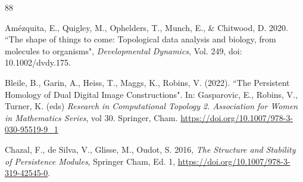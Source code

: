 \documentclass[a4paper,11pt]{article}
\theoremstyle{definition}
\begin{document}
\begin{thebibliography}{88} %


Amézquita, E., Quigley, M., Ophelders, T.,  Munch, E., \& Chitwood, D. 2020. ``The shape of things to come: Topological data analysis and biology, from molecules to organisms", \textit{Developmental Dynamics}, Vol. 249, doi: 10.1002/dvdy.175. 

 
 

 Bleile, B., Garin, A., Heiss, T., Maggs, K., Robins, V. (2022). ``The Persistent Homology of Dual Digital Image Constructions". In: Gasparovic, E., Robins, V., Turner, K. (eds) \textit{Research in Computational Topology 2. Association for Women in Mathematics Series}, vol 30. Springer, Cham. \url{https://doi.org/10.1007/978-3-030-95519-9_1}
 
 

  Chazal, F., de Silva, V., Glisse, M., Oudot, S. 2016, \emph{The Structure and Stability of Persistence Modules}, Springer Cham, Ed. 1, \url{https://doi.org/10.1007/978-3-319-42545-0}.

 
 

\end{thebibliography}
\end{document}
